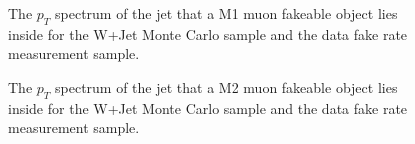 \begin{figure}[!htbp]
\begin{center}
\caption{The $p_{T}$ spectrum of the jet that a M1 muon fakeable object lies inside for the 
W+Jet Monte Carlo sample and the data fake rate measurement sample.}
\label{fig:mu_fr_jetspectrumM1}
\end{center}
\end{figure}

\begin{figure}[!htbp]
\begin{center}
\caption{The $p_{T}$ spectrum of the jet that a M2 muon fakeable object lies inside for the 
W+Jet Monte Carlo sample and the data fake rate measurement sample.}
\label{fig:mu_fr_jetspectrumM2}
\end{center}
\end{figure}


